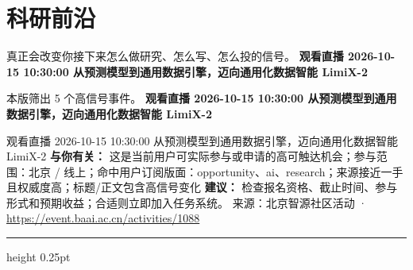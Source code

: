 \documentclass[10.5pt]{ctexart}
\begin{document}
\section*{科研前沿}
{\color{ormuted} 真正会改变你接下来怎么做研究、怎么写、怎么投的信号。}
\vspace{2mm}
{\LARGE\bfseries 观看直播 2026-10-15 10:30:00 从预测模型到通用数据引擎，迈向通用化数据智能 LimiX-2}\par
\vspace{1mm}
{\color{ormuted} 本版筛出 5 个高信号事件。}
\vspace{3mm}
{\Large\bfseries 观看直播 2026-10-15 10:30:00 从预测模型到通用数据引擎，迈向通用化数据智能 LimiX-2}\par
观看直播 2026-10-15 10:30:00 从预测模型到通用数据引擎，迈向通用化数据智能 LimiX-2
\textbf{与你有关：} 这是当前用户可实际参与或申请的高可触达机会；参与范围：北京 / 线上；命中用户订阅版面：opportunity、ai、research；来源接近一手且权威度高；标题/正文包含高信号变化
\textbf{建议：} 检查报名资格、截止时间、参与形式和预期收益；合适则立即加入任务系统。
{\footnotesize\color{ormuted} 来源：北京智源社区活动 · \url{https://event.baai.ac.cn/activities/1088}}
\vspace{4mm}
\hrule height 0.25pt
\vspace{3mm}
\end{document}
